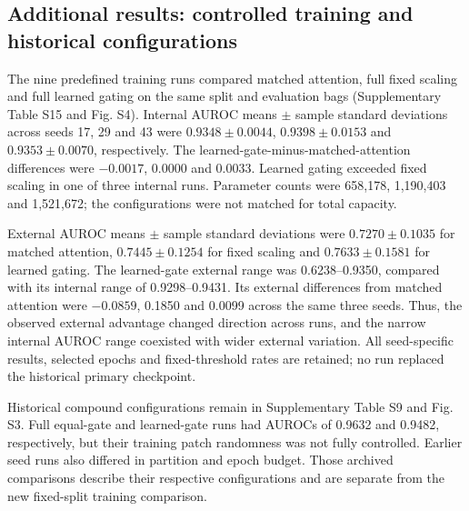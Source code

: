 \clearpage
\subsection*{Additional results: controlled training and historical configurations}

The nine predefined training runs compared matched attention, full fixed scaling and full learned gating on the same split and evaluation bags (Supplementary Table S15 and Fig. S4). Internal AUROC means $\pm$ sample standard deviations across seeds 17, 29 and 43 were $0.9348\pm0.0044$, $0.9398\pm0.0153$ and $0.9353\pm0.0070$, respectively. The learned-gate-minus-matched-attention differences were $-0.0017$, 0.0000 and 0.0033. Learned gating exceeded fixed scaling in one of three internal runs. Parameter counts were 658,178, 1,190,403 and 1,521,672; the configurations were not matched for total capacity.

External AUROC means $\pm$ sample standard deviations were $0.7270\pm0.1035$ for matched attention, $0.7445\pm0.1254$ for fixed scaling and $0.7633\pm0.1581$ for learned gating. The learned-gate external range was 0.6238--0.9350, compared with its internal range of 0.9298--0.9431. Its external differences from matched attention were $-0.0859$, 0.1850 and 0.0099 across the same three seeds. Thus, the observed external advantage changed direction across runs, and the narrow internal AUROC range coexisted with wider external variation. All seed-specific results, selected epochs and fixed-threshold rates are retained; no run replaced the historical primary checkpoint.

Historical compound configurations remain in Supplementary Table S9 and Fig. S3. Full equal-gate and learned-gate runs had AUROCs of 0.9632 and 0.9482, respectively, but their training patch randomness was not fully controlled. Earlier seed runs also differed in partition and epoch budget. Those archived comparisons describe their respective configurations and are separate from the new fixed-split training comparison.

